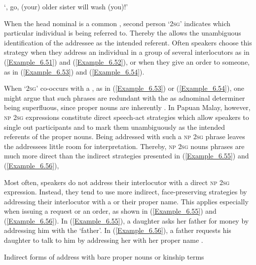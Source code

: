  ‘, go, (your) older sister will wash (you)!’ \textstyleExampleSource{[081014-006-CvPr.0048]}
\z



When the head nominal is a common , second person  ‘\textsc{2sg}’ indicates which particular individual is being referred to. Thereby the  allows the unambiguous identification of the addressee as the intended referent. Often speakers choose this strategy when they address an individual in a group of several interlocutors as in (\ref{Example_6.51}) and (\ref{Example_6.52}), or when they give an order to someone, as in (\ref{Example_6.53}) and (\ref{Example_6.54}).



When  ‘\textsc{2sg}’ co-occurs with a , as in (\ref{Example_6.53}) or (\ref{Example_6.54}), one might argue that such  phrases are redundant with the  as adnominal determiner being superfluous, since proper nouns are inherently . In Papuan Malay, however, \textsc{np} \textsc{2sg} expressions constitute direct speech-act strategies which allow speakers to single out participants and to mark them unambiguously as the intended referents of the proper nouns. Being addressed with such a \textsc{np} \textsc{2sg}  phrase leaves the addressees little room for interpretation. Thereby, \textsc{np} \textsc{2sg} nouns phrases are much more direct than the indirect strategies presented in (\ref{Example_6.55}) and (\ref{Example_6.56}),



Most often, speakers do not address their interlocutor with a direct \textsc{np} \textsc{2sg} expression. Instead, they tend to use more indirect, face-preserving strategies by addressing their interlocutor with a  or their proper name. This applies especially when issuing a request or an order, as shown in (\ref{Example_6.55}) and (\ref{Example_6.56}). In (\ref{Example_6.55}), a daughter asks her father for money by addressing him with the   ‘father’. In (\ref{Example_6.56}), a father requests his daughter to talk to him by addressing her with her proper name .



\begin{styleExampleTitle}
Indirect forms of address with bare proper nouns or kinship terms
\end{styleExampleTitle}

